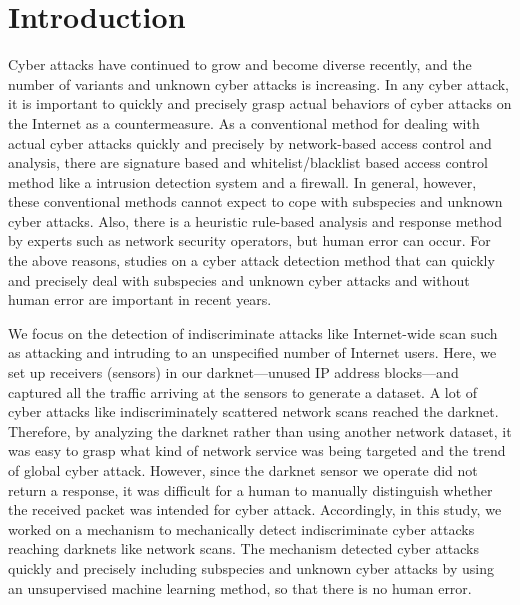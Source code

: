 \documentclass[conference]{IEEEtran}
\begin{document}
\section{Introduction}
Cyber attacks have continued to grow and become diverse recently, and the number of variants and unknown cyber attacks is increasing.
In any cyber attack, it is important to quickly and precisely grasp actual behaviors of cyber attacks on the Internet as a countermeasure.
As a conventional method for dealing with actual cyber attacks quickly and precisely by network-based access control and analysis, there are signature based and whitelist/blacklist based access control method like a intrusion detection system and a firewall.
In general, however, these conventional methods cannot expect to cope with subspecies and unknown cyber attacks.
Also, there is a heuristic rule-based analysis and response method by experts such as network security operators, but human error can occur.
For the above reasons, studies on a cyber attack detection method that can quickly and precisely deal with subspecies and unknown cyber attacks and without human error are important in recent years.



We focus on the detection of indiscriminate attacks like Internet-wide scan such as attacking and intruding to an unspecified number of Internet users.
Here, we set up receivers (sensors) in our darknet---unused IP address blocks---and captured all the traffic arriving at the sensors to generate a dataset.
A lot of cyber attacks like indiscriminately scattered network scans reached the darknet.
Therefore, by analyzing the darknet rather than using another network dataset, it was easy to grasp what kind of network service was being targeted and the trend of global cyber attack.
However, since the darknet sensor we operate did not return a response, it was difficult for a human to manually distinguish whether the received packet was intended for cyber attack.
Accordingly, in this study, we worked on a mechanism to mechanically detect indiscriminate cyber attacks reaching darknets like network scans.
The mechanism detected cyber attacks quickly and precisely including subspecies and unknown cyber attacks by using an unsupervised machine learning method, so that there is no human error.
\end{document}
